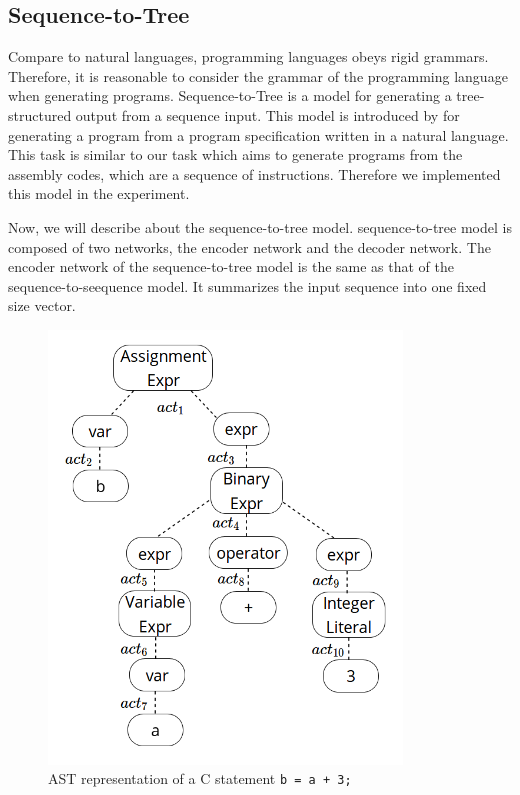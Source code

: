 \documentclass[senior,final,11pt]{iscs-thesis}
\begin{document}






\subsection{Sequence-to-Tree}
Compare to natural languages, programming languages obeys rigid grammars. %
Therefore, it is reasonable to consider the grammar of the programming language when generating programs.
Sequence-to-Tree is a model for generating a tree-structured output from a sequence input. 
This model is introduced by \citet{Seq2Tree} for generating a program from a program specification written in a natural language. 
This task is similar to our task which aims to generate programs from the assembly codes, which are a sequence of instructions.
Therefore we implemented this model in the experiment.

Now, we will describe about the sequence-to-tree model.
sequence-to-tree model is composed of two networks, the encoder network and the decoder network.
The encoder network of the sequence-to-tree model is the same as that of the sequence-to-seequence model. It summarizes the input sequence into one fixed size vector.

\begin{figure}[]
	\begin{center}
	\includegraphics[height=11.5cm]{ast_zu.png}
	\end{center}
	\caption{AST representation of a C statement \texttt{b = a + 3;} }
	\label{fig:ast_zu}
\end{figure}
\end{document}
